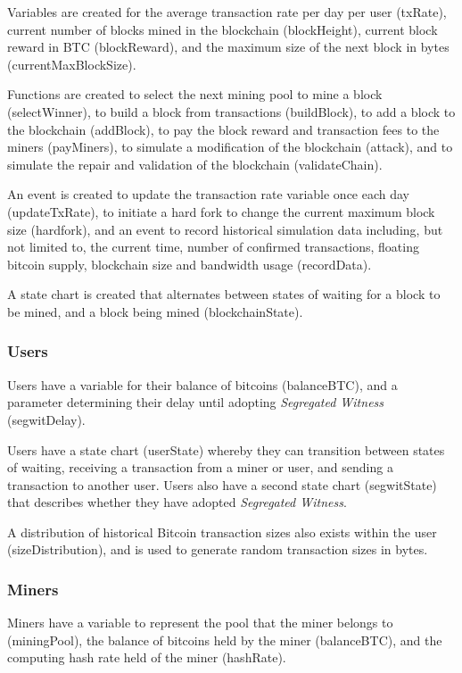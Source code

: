 \documentclass[12pt]{report}
\begin{document}
Variables are created for the average transaction rate per day per user (txRate), current number of blocks mined in the blockchain (blockHeight), current block reward in BTC (blockReward), and the maximum size of the next block in bytes (currentMaxBlockSize).

Functions are created to select the next mining pool to mine a block (selectWinner), to build a block from transactions (buildBlock), to add a block to the blockchain (addBlock), to pay the block reward and transaction fees to the miners (payMiners), to simulate a modification of the blockchain (attack), and to simulate the repair and validation of the blockchain (validateChain). 

An event is created to update the transaction rate variable once each day (updateTxRate), to initiate a hard fork to change the current maximum block size (hardfork), and an event to record historical simulation data including, but not limited to, the current time, number of confirmed transactions, floating bitcoin supply, blockchain size and bandwidth usage (recordData).

A state chart is created that alternates between states of waiting for a block to be mined, and a block being mined (blockchainState).


\subsubsection{Users}
Users have a variable for their balance of bitcoins (balanceBTC), and a parameter determining their delay until adopting \textit{Segregated Witness} (segwitDelay). 

Users have a state chart (userState) whereby they can transition between states of waiting, receiving a transaction from a miner or user, and sending a transaction to another user. Users also have a second state chart (segwitState) that describes whether they have adopted \textit{Segregated Witness}. 

A distribution of historical Bitcoin transaction sizes also exists within the user (sizeDistribution), and is used to generate random transaction sizes in bytes.

\subsubsection{Miners}
Miners have a variable to represent the pool that the miner belongs to (miningPool), the balance of bitcoins held by the miner (balanceBTC), and the computing hash rate held of the miner (hashRate). 
\end{document}
